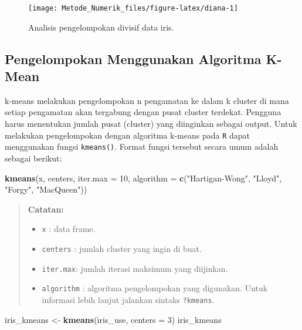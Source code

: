 \documentclass[]{book}
\newenvironment{Shaded}{\begin{snugshade}}{\end{snugshade}}
\newcommand{\DataTypeTok}[1]{\textcolor[rgb]{0.13,0.29,0.53}{#1}}
\newcommand{\DecValTok}[1]{\textcolor[rgb]{0.00,0.00,0.81}{#1}}
\newcommand{\KeywordTok}[1]{\textcolor[rgb]{0.13,0.29,0.53}{\textbf{#1}}}
\newcommand{\NormalTok}[1]{#1}
\newcommand{\StringTok}[1]{\textcolor[rgb]{0.31,0.60,0.02}{#1}}
\providecommand{\tightlist}{%
  \setlength{\itemsep}{0pt}\setlength{\parskip}{0pt}}
\theoremstyle{definition}
\theoremstyle{definition}
\theoremstyle{definition}
\theoremstyle{remark}
\begin{document}
\begin{figure}

{\centering \texttt{[image: Metode\_Numerik\_files/figure-latex/diana-1]} 

}

\caption{Analisis pengelompokan divisif data iris.}\label{fig:diana}
\end{figure}

\hypertarget{pengelompokan-menggunakan-algoritma-k-mean}{%
\subsection{Pengelompokan Menggunakan Algoritma K-Mean}\label{pengelompokan-menggunakan-algoritma-k-mean}}

k-means melakukan pengelompokan n pengamatan ke dalam k cluster di mana setiap pengamatan akan tergabung dengan pusat cluster terdekat. Pengguna harus menentukan jumlah pusat (cluster) yang diinginkan sebagai output. Untuk melakukan pengelompokan dengan algoritma k-means pada \texttt{R} dapat menggunakan fungsi \texttt{kmeans()}. Format fungsi tersebut secara umum adalah sebagai berikut:

\begin{Shaded}
\begin{Highlighting}[]
\KeywordTok{kmeans}\NormalTok{(x, centers, }\DataTypeTok{iter.max =} \DecValTok{10}\NormalTok{,}
       \DataTypeTok{algorithm =} \KeywordTok{c}\NormalTok{(}\StringTok{"Hartigan-Wong"}\NormalTok{, }\StringTok{"Lloyd"}\NormalTok{, }\StringTok{"Forgy"}\NormalTok{,}
                     \StringTok{"MacQueen"}\NormalTok{))}
\end{Highlighting}
\end{Shaded}

\begin{quote}
\textbf{Catatan:}

\begin{itemize}
\tightlist
\item
  \texttt{x} : data frame.
\item
  \texttt{centers} : jumlah cluster yang ingin di buat.
\item
  \texttt{iter.max}: jumlah iterasi maksimum yang diijinkan.
\item
  \texttt{algorithm} : algoritma pengelompokan yang digunakan. Untuk informasi lebih lanjut jalankan sintaks \texttt{?kmeans}.
\end{itemize}
\end{quote}

\begin{Shaded}
\begin{Highlighting}[]
\NormalTok{iris_kmeans <-}\StringTok{ }\KeywordTok{kmeans}\NormalTok{(iris_use, }\DataTypeTok{centers =} \DecValTok{3}\NormalTok{)}
\NormalTok{iris_kmeans}
\end{Highlighting}
\end{Shaded}
\end{document}
